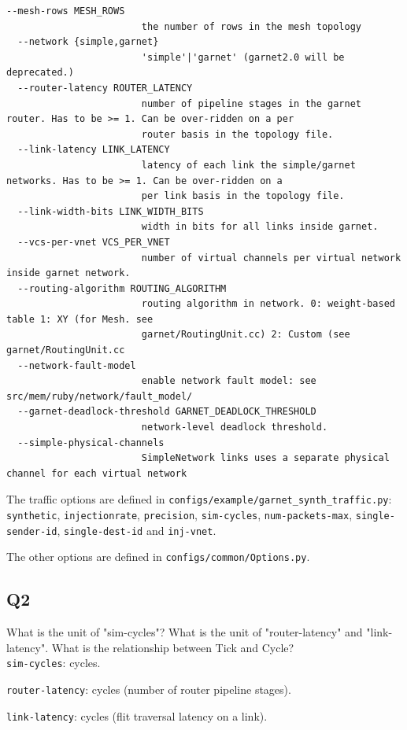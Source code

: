 \documentclass[11pt]{article}
\begin{document}
\begin{lstlisting}[caption={Options for garnet\_synth\_traffic.py}]
  --mesh-rows MESH_ROWS
                        the number of rows in the mesh topology
  --network {simple,garnet}
                        'simple'|'garnet' (garnet2.0 will be deprecated.)
  --router-latency ROUTER_LATENCY
                        number of pipeline stages in the garnet router. Has to be >= 1. Can be over-ridden on a per
                        router basis in the topology file.
  --link-latency LINK_LATENCY
                        latency of each link the simple/garnet networks. Has to be >= 1. Can be over-ridden on a
                        per link basis in the topology file.
  --link-width-bits LINK_WIDTH_BITS
                        width in bits for all links inside garnet.
  --vcs-per-vnet VCS_PER_VNET
                        number of virtual channels per virtual network inside garnet network.
  --routing-algorithm ROUTING_ALGORITHM
                        routing algorithm in network. 0: weight-based table 1: XY (for Mesh. see
                        garnet/RoutingUnit.cc) 2: Custom (see garnet/RoutingUnit.cc
  --network-fault-model
                        enable network fault model: see src/mem/ruby/network/fault_model/
  --garnet-deadlock-threshold GARNET_DEADLOCK_THRESHOLD
                        network-level deadlock threshold.
  --simple-physical-channels
                        SimpleNetwork links uses a separate physical channel for each virtual network
\end{lstlisting}

The traffic options are defined in \texttt{configs/example/garnet\_synth\_traffic.py}: \texttt{synthetic}, \texttt{injectionrate}, \texttt{precision}, \texttt{sim-cycles}, \texttt{num-packets-max}, \texttt{single-sender-id}, \texttt{single-dest-id} and \texttt{inj-vnet}. 

The other options are defined in \texttt{configs/common/Options.py}.

\subsection*{Q2}
What is the unit of "sim-cycles"? What is the unit of "router-latency" and "link-latency". What is the relationship between Tick and Cycle?\\

\texttt{sim-cycles}: cycles. 

\texttt{router-latency}: cycles (number of router pipeline stages). 

\texttt{link-latency}: cycles (flit traversal latency on a link). 
\end{document}
